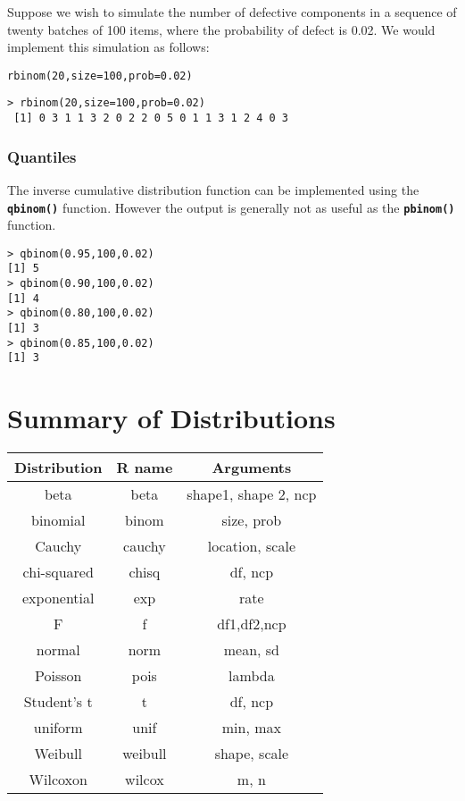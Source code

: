 \documentclass[a4paper,12pt]{article}
\begin{document}
Suppose we wish to simulate the number of defective components in a sequence of twenty batches of 100 items, where the probability of defect is 0.02. We would implement this simulation as follows:

\begin{framed}
\begin{verbatim}
rbinom(20,size=100,prob=0.02)
\end{verbatim}
\end{framed}

\begin{verbatim}
> rbinom(20,size=100,prob=0.02)
 [1] 0 3 1 1 3 2 0 2 2 0 5 0 1 1 3 1 2 4 0 3
\end{verbatim}
\subsubsection{Quantiles}
The inverse cumulative distribution function can be implemented using the \texttt{\textbf{qbinom()}} function.
However the output is generally not as useful as the \texttt{\textbf{pbinom()}} function.
\begin{verbatim}
> qbinom(0.95,100,0.02)
[1] 5
> qbinom(0.90,100,0.02)
[1] 4
> qbinom(0.80,100,0.02)
[1] 3
> qbinom(0.85,100,0.02)
[1] 3
\end{verbatim}


\section{Summary of Distributions}
\begin{center}
\begin{tabular}{|c|c|c|}
\hline
Distribution &	R name & Arguments\\ \hline
beta &	beta &	shape1, shape 2, ncp\\
binomial &	binom	& size, prob\\
Cauchy	& cauchy	& location, scale\\
chi-squared &	chisq &	df, ncp\\
exponential	& exp &	rate\\
F	& f	& df1,df2,ncp\\
normal &	norm &	mean, sd\\
Poisson&	pois & 	lambda\\
Student's t	& t&	df, ncp\\
uniform	& unif &	min, max\\
Weibull	& weibull & shape, scale\\
Wilcoxon &	wilcox &	m, n\\ 
\hline 
\end{tabular}
\end{center}
 
\end{document}
